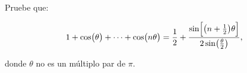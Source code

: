\documentclass[../main.tex]{subfiles}
\begin{document}
\begin{problema}
	Pruebe que:

	\begin{equation}
		1 + \cos\bigl(\theta\bigr) + \cdots + \cos\bigl(n\theta\bigr) = \dfrac{1}{2} +
		\dfrac{\sin\Bigl[\bigl(n + \tfrac{1}{2}\bigr)\theta\Bigr]}{2
			\sin\bigl(\tfrac{\theta}{2}\bigr)},
	\end{equation}

	donde \(\theta\) no es un múltiplo par de \(\pi\).
\end{problema}
\end{document}
